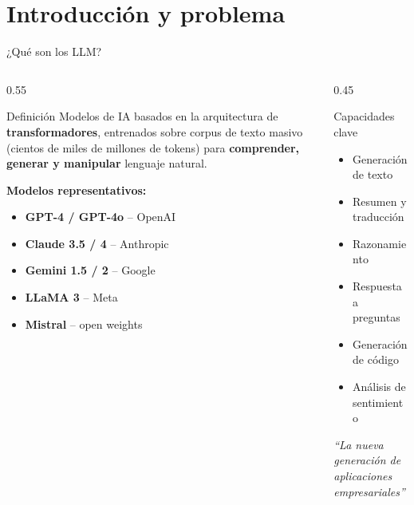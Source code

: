 \documentclass[10pt,aspectratio=169]{beamer}
\begin{document}
\section{Introducción y problema}
\begin{frame}{¿Qué son los LLM?}
    \begin{columns}[T]
        \begin{column}{0.55\textwidth}
            \begin{block}{Definición}
                Modelos de IA basados en la arquitectura de \textbf{transformadores}, entrenados sobre corpus de texto masivo (cientos de miles de millones de tokens) para \textbf{comprender, generar y manipular} lenguaje natural.
            \end{block}
            \vspace{0.3cm}
            \textbf{Modelos representativos:}
            \begin{itemize}
                \item \textbf{GPT-4 / GPT-4o} -- OpenAI
                \item \textbf{Claude 3.5 / 4} -- Anthropic
                \item \textbf{Gemini 1.5 / 2} -- Google
                \item \textbf{LLaMA 3} -- Meta
                \item \textbf{Mistral} -- open weights
            \end{itemize}
        \end{column}
        \begin{column}{0.45\textwidth}
            \begin{alertblock}{Capacidades clave}
                \begin{itemize}
                    \item Generación de texto
                    \item Resumen y traducción
                    \item Razonamiento
                    \item Respuesta a preguntas
                    \item Generación de código
                    \item Análisis de sentimiento
                \end{itemize}
            \end{alertblock}
            \vspace{0.2cm}
            \begin{center}
                \textcolor{azulPrincipal}{\textit{``La nueva generación de aplicaciones empresariales''}}
            \end{center}
        \end{column}
    \end{columns}
\end{frame}
\end{document}
